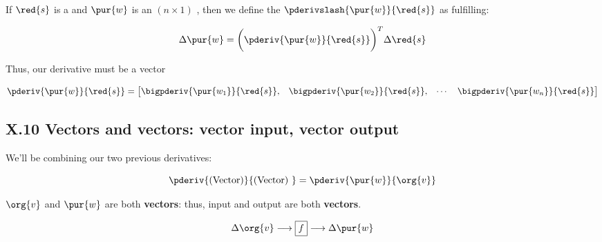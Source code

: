         \begin{definition}
            If $\red{s}$ is a  and $\pur{w}$ is an $(n \times 1)$ , then we define the  $\pderivslash{ \pur{w} }{ \red{s} }$ as fulfilling:
            
            \begin{equation*}
                \Delta \pur{w}
                =
                \bigg(
                    \pderiv{ \pur{w} }{ \red{s} } 
                \bigg)^T
                \Delta \red{s}
            \end{equation*}
            
            Thus, our derivative must be a  vector
            
            \begin{equation*}
                \pderiv{ \pur{w} }{ \red{s} } 
                =
                \begin{bmatrix}
                    \bigpderiv{ \pur{w_1} }{ \red{s} }, &
                    \bigpderiv{ \pur{w_2} }{ \red{s} }, &
                    \cdots &
                    \bigpderiv{ \pur{w_n} }{ \red{s} } 
                \end{bmatrix}
            \end{equation*}
        \end{definition}
    
    \secdiv
    
    \subsection*{X.10 \quad Vectors and vectors: vector input, vector output}  
    
        We'll be combining our two previous derivatives: 
        
        \begin{equation}
            \pderiv{ \text{(Vector)} } { \text{(Vector) } }
            =
            \pderiv{ \pur{w} }{ \org{v} } 
        \end{equation}
        
        $\org{v}$ and $\pur{w}$ are both \textbf{vectors}: thus, input and output are both \textbf{vectors}.
        
        \begin{equation}
            \Delta \org{v}
            \longrightarrow
            \boxed{f}
            \longrightarrow
            \Delta \pur{w}
        \end{equation}
        
